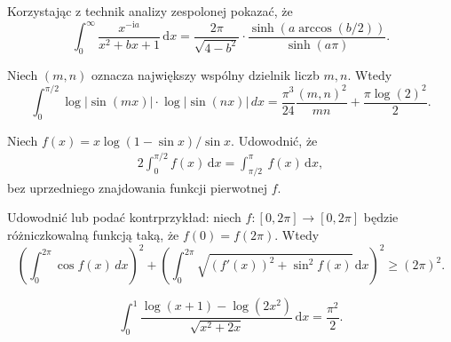 
\begin{problem}[pytanie 2529614]
    Korzystając z technik analizy zespolonej pokazać, że
    \label{stack_2529614}%
    \begin{equation}
        \int_0^\infty \frac{x^{-\mathrm{i}a}}{x^2+bx+1} \,\mathrm{d}x = \frac{2\pi}{\sqrt{4-b^2}} \cdot \frac{\sinh (a \arccos (b/2))}{\sinh (a \pi)}.
    \end{equation}
\end{problem}


\begin{problem}[pytanie 2826571]
    \label{stack_2826571}%
    Niech $(m, n)$ oznacza największy wspólny dzielnik liczb $m, n$.
    Wtedy
    \begin{equation}
        \int_0^{\pi/2} \log \lvert \sin(mx) \rvert \cdot \log \lvert\sin(nx)\rvert \, dx = \frac{\pi^3}{24} \frac{(m,n)^2}{mn}+\frac{\pi\log (2)^2}{2}.
    \end{equation}
\end{problem}


\begin{problem}[pytanie 3490404]
    \label{stack_3490404}%
    Niech $f(x) = x \log (1 - \sin x) / \sin x$.
    Udowodnić, że
    \begin{align}
        2\int_0^{\pi/2} f(x) \,\mathrm{d}x =
        \int_{\pi/2}^\pi\ f(x) \,\mathrm{d}x,
    \end{align}
    bez uprzedniego znajdowania funkcji pierwotnej $f$.
\end{problem}


\begin{problem}[pytanie 3981861]
    Udowodnić lub podać kontrprzykład: niech $f \colon [0, 2\pi] \to [0, 2\pi]$ będzie różniczkowalną funkcją taką, że $f(0) = f(2\pi)$. Wtedy
    \label{stack_3981861}%
    \begin{equation}
        \left(\int_0^{2 \pi} \cos f(x) \,d x\right)^2
        +
        \left(\int_0^{2 \pi} \sqrt{(f'(x))^2+\sin^2 f(x)} \, \mathrm{d}x\right)^2 \ge (2 \pi)^2.
    \end{equation}
\end{problem}


\begin{problem}[pytanie 4568778]
    \label{stack_4568778}%
    \begin{equation}
        \int_0^1 \frac{\log (x+1) - \log(2x^2)}{\sqrt{x^2 + 2x}}\,\mathrm{d}x = \frac{\pi^2}{2}.
    \end{equation}
\end{problem}

%